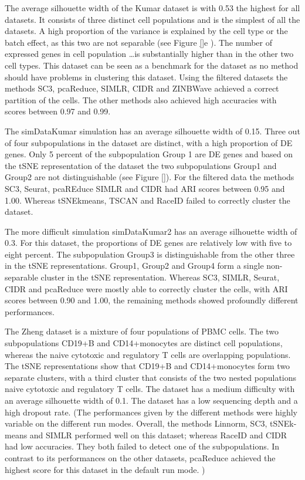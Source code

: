 \documentclass[11pt, a4paper]{article}\usepackage[]{graphicx}\usepackage[]{color}
\begin{document}
The average silhouette width of the Kumar dataset is with 0.53 the highest for all datasets. It consists of three distinct cell populations and is the simplest of all the datasets.  A high proportion of the variance is explained by the cell type or the batch effect, as this two are not separable (see Figure \ref{}e ). The number of expressed genes in cell population \dots is substantially higher than in the other two cell types. This dataset can be seen as a benchmark for the dataset as no method should have problems in clustering this dataset. Using the filtered datasets the methods SC3, pcaReduce, SIMLR, CIDR and ZINBWave achieved a correct partition of the cells. The other methods also achieved high accuracies with scores between 0.97 and 0.99. 

The simDataKumar simulation has an average silhouette width of 0.15. Three out of four subpopulations in the dataset are distinct, with a high proportion of DE genes. Only 5 percent of the subpopulation Group 1 are DE genes and based on the tSNE representation of the dataset the two subpopulations Group1 and Group2 are not distinguishable (see Figure \ref{}). For the filtered data the methods SC3, Seurat, pcaREduce SIMLR and CIDR had ARI scores between 0.95 and 1.00. Whereas tSNEkmeans, TSCAN and RaceID failed to correctly cluster the dataset. 

The more difficult simulation simDataKumar2 has an average silhouette width of 0.3. For this dataset, the proportions of DE genes are relatively low with five to eight percent. The subpopulation Group3 is distinguishable from the other three in the tSNE representations. Group1, Group2 and Group4 form a single non-separable cluster in the tSNE representation. Whereas SC3, SIMLR, Seurat, CIDR and pcaReduce were mostly able to correctly cluster the cells, with ARI scores between 0.90 and 1.00, the remaining methods showed profoundly different performances. 


The Zheng dataset is a mixture of four populations of PBMC cells. The two subpopulations CD19+B and CD14+monocytes are distinct cell populations, whereas the naive cytotoxic and regulatory T cells are overlapping populations. The tSNE representations show that CD19+B and CD14+monocytes form two separate clusters, with a third cluster that consists of the two nested populations naive cytotoxic and regulatory T cells. The dataset has a medium difficulty with an average silhouette width of 0.1. The dataset has a low sequencing depth and a high dropout rate. (The performances given by the different methods were highly variable on the different run modes. Overall, the methods Linnorm, SC3, tSNEk-means and SIMLR performed well on this dataset; whereas RaceID and CIDR had low accuracies. They both failed to detect one of the subpopulations. In contrast to its performances on the other datasets, pcaReduce achieved the highest score for this dataset in the default run mode. )
\end{document}
